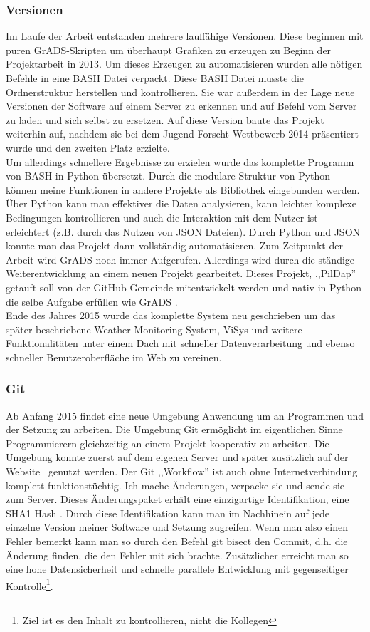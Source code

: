 \subsubsection{Versionen}
Im Laufe der Arbeit entstanden mehrere lauffähige Versionen.
Diese beginnen mit puren GrADS-Skripten um überhaupt Grafiken
zu erzeugen zu Beginn der Projektarbeit in 2013.
Um dieses Erzeugen zu automatisieren wurden alle nötigen Befehle in eine BASH Datei verpackt.
Diese BASH Datei musste die Ordnerstruktur herstellen und kontrollieren.
Sie war außerdem in der Lage neue Versionen der Software auf einem Server zu erkennen
und auf Befehl vom Server zu laden und sich selbst zu ersetzen.
Auf diese Version baute das Projekt weiterhin auf,
nachdem sie bei dem Jugend Forscht Wettbewerb 2014
präsentiert wurde und den zweiten Platz erzielte.\\
Um allerdings schnellere Ergebnisse zu erzielen wurde
das komplette Programm von BASH in Python übersetzt.
Durch die modulare Struktur von Python können meine
Funktionen in andere Projekte als Bibliothek eingebunden werden.\\
Über Python kann man effektiver die Daten analysieren,
kann leichter komplexe Bedingungen kontrollieren und
auch die Interaktion mit dem Nutzer ist erleichtert
(z.B. durch das Nutzen von JSON Dateien).
Durch Python und JSON konnte man das Projekt dann vollständig automatisieren.
Zum Zeitpunkt der Arbeit wird GrADS noch immer Aufgerufen. Allerdings
wird durch die ständige Weiterentwicklung an einem neuen Projekt gearbeitet.
Dieses Projekt, ,,PilDap'' getauft soll von der GitHub Gemeinde mitentwickelt
werden und nativ in Python die selbe Aufgabe erfüllen wie GrADS \cite{pildap}.\\
Ende des Jahres 2015 wurde das komplette System neu geschrieben um das später
beschriebene Weather Monitoring System, ViSys und weitere Funktionalitäten
unter einem Dach mit schneller Datenverarbeitung und ebenso schneller
Benutzeroberfläche im Web zu vereinen.

\subsubsection*{Git}
Ab Anfang 2015 findet eine neue Umgebung Anwendung um an
Programmen und der Setzung zu arbeiten.
Die Umgebung Git \cite{gitrepo}
ermöglicht im eigentlichen Sinne Programmierern gleichzeitig an
einem Projekt kooperativ zu arbeiten.
Die Umgebung konnte zuerst auf dem eigenen Server und später zusätzlich
auf der Website  \cite{github} genutzt werden.
Der Git ,,Workflow'' ist auch ohne Internetverbindung komplett funktionstüchtig.
Ich mache Änderungen, verpacke sie und sende sie zum Server.
Dieses Änderungspaket erhält eine einzigartige Identifikation, eine SHA1 Hash \cite{gitsha1}.
Durch diese Identifikation kann man im Nachhinein auf jede einzelne Version
meiner Software und Setzung zugreifen. Wenn man also einen Fehler bemerkt kann man so
durch den Befehl $\text{git bisect}$ den Commit, d.h. die Änderung finden, die den Fehler
mit sich brachte.
Zusätzlicher erreicht man so eine hohe Datensicherheit \cite{linussaves} und schnelle parallele Entwicklung mit gegenseitiger Kontrolle\footnote{Ziel ist es den Inhalt zu kontrollieren, nicht die Kollegen}.

